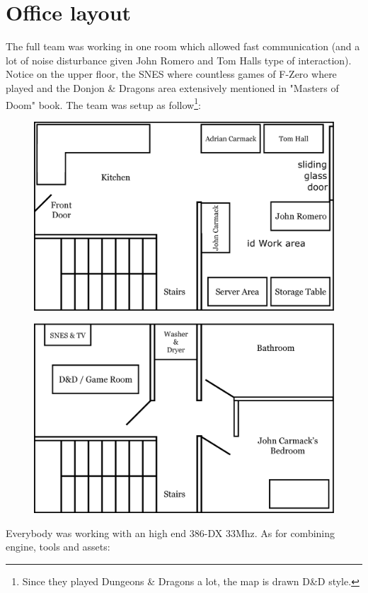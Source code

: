 \documentclass[book.tex]{subfiles}
\begin{document}
\section{Office layout}
The full team was working in one room which allowed fast communication (and a lot of noise disturbance given John Romero and Tom Halls type of interaction). Notice on the upper floor, the SNES where countless games of F-Zero where played and the Donjon \& Dragons area extensively mentioned in "Masters of Doom" book.
The team was setup as follow\footnote{Since they played Dungeons \& Dragons a lot, the map is drawn D\&D style.}:
\par
\begin{figure}[H]
  \centering
  \includegraphics[width=\textwidth]{imgs/drawings/map/id-software-office-madison_bottom_floor.eps}
\end{figure}
\par
\begin{figure}[H]
  \centering
  \includegraphics[width=\textwidth]{imgs/drawings/map/id-software-office-madison_top_floor.eps}
\end{figure}
Everybody was working with an high end 386-DX 33Mhz. As for combining engine, tools and assets:\\
\end{document}
